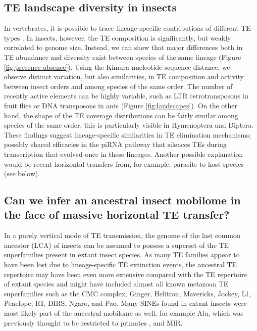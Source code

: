 \subsection{TE landscape diversity in
insects}\label{te-landscape-diversity-in-insects}

In vertebrates, it is possible to trace lineage-specific contributions
of different TE types \citep{Chalopin2015}. In insects, however, the TE
composition is significantly, but weakly correlated to genome size.
Instead, we can show that major differences both in TE abundance and
diversity exist between species of the same lineage (Figure
\ref{fig:presence-absence}). Using the Kimura nucleotide sequence
distance, we observe distinct variation, but also similarities, in TE
composition and activity between insect orders and among species of the
same order. The number of recently active elements can be highly
variable, such as LTR retrotransposons in fruit flies or DNA transposons
in ants (Figure \ref{fig:landscapes}). On the other hand, the shape of
the TE coverage distributions can be fairly similar among species of the
same order; this is particularly visible in Hymenoptera and Diptera.
These findings suggest lineage-specific similarities in TE elimination
mechanisms; possibly shared efficacies in the piRNA pathway that
silences TEs during transcription \citep{LeThomas2013} that evolved once
in these lineages.  Another possible explanation would be recent
horizontal transfers from, for example, parasite to host species (see
below).

\subsection{Can we infer an ancestral insect mobilome in the face of
massive horizontal TE
transfer?}\label{can-we-infer-an-ancestral-insect-mobilome-in-the-face-of-massive-horizontal-te-transfer}

In a purely vertical mode of TE transmission, the genome of the last
common ancestor (LCA) of insects can be assumed to possess a superset of
the TE superfamilies present in extant insect species. As many TE
families appear to have been lost due to lineage-specific TE extinction
events, the ancestral TE repertoire may have been even more extensive
compared with the TE repertoire of extant species and might have
included almost all known metazoan TE superfamilies such as the CMC
complex, Ginger, Helitron, Mavericks, Jockey, L1, Penelope, R1, DIRS,
Ngaro, and Pao. Many SINEs found in extant insects were most likely part
of the ancestral mobilome as well, for example Alu, which was previously
thought to be restricted to primates \citep{Deininger2011}, and MIR.

